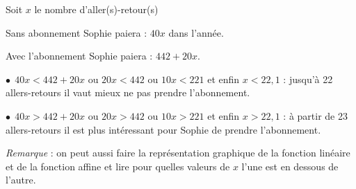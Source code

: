 
\medskip

%
%
%
Soit $x$ le nombre d'aller(s)-retour(s)

Sans abonnement Sophie paiera : $40x$ dans l'année.

Avec l'abonnement Sophie paiera : $442 + 20x$.

$\bullet~~$$40x < 442 + 20x$ ou $20x < 442$ ou $10x < 221$ et enfin $x < 22,1$ : jusqu'à 22 allers-retours il vaut mieux ne pas prendre l'abonnement.

$\bullet~~$$40x > 442 + 20x$ ou $20x > 442$ ou $10x > 221$ et enfin $x > 22,1$ : à partir de 23 allers-retours il est plus intéressant pour Sophie de prendre l'abonnement.

\emph{Remarque} : on peut aussi faire la représentation graphique de la fonction linéaire et de la fonction affine et lire pour quelles valeurs de $x$ l'une est en dessous de l'autre.
